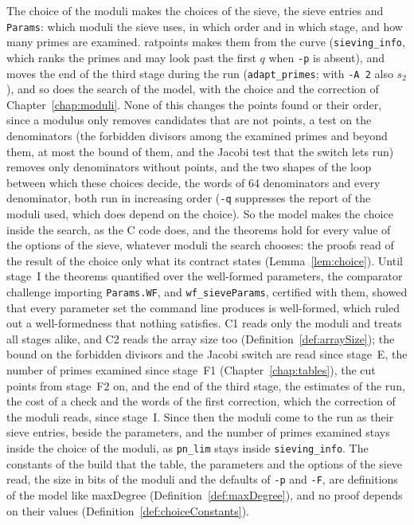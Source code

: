 The choice of the moduli makes the choices of the sieve, the sieve entries and \verb|Params|: which
moduli the sieve uses, in which order and in which stage, and how many primes are examined.
ratpoints makes them from the curve (\verb|sieving_info|, which ranks the primes and may look past
the first $q$ when \verb|-p| is absent), and moves the end of the third stage during the run
(\verb|adapt_primes|; with \verb|-A 2| also $s_2$), and so does the search of the model, with the
choice and the correction of Chapter~\ref{chap:moduli}. None of this changes the points found or
their order, since a modulus only removes candidates that are not points, a test on the denominators
(the forbidden divisors among the examined primes and beyond them, at most the bound of them, and
the Jacobi test that the switch lets run) removes only denominators without points, and the two
shapes of the loop between which these choices decide, the words of 64 denominators and every
denominator, both run in increasing order (\verb|-q| suppresses the report of the moduli used, which
does depend on the choice). So the model makes the choice inside the search, as the C code does, and
the theorems hold for every value of the options of the sieve, whatever moduli the search chooses:
the proofs read of the result of the choice only what its contract states (Lemma~\ref{lem:choice}).
Until stage~I the theorems quantified over the well-formed parameters, the comparator challenge
importing \verb|Params.WF|, and \verb|wf_sieveParams|, certified with them, showed that every
parameter set the command line produces is well-formed, which ruled out a well-formedness that
nothing satisfies. C1 reads only the moduli and treats all stages alike, and C2 reads the array size
too (Definition~\ref{def:arraySize}); the bound on the forbidden divisors and the Jacobi switch are
read since stage~E, the number of primes examined since stage~F1 (Chapter~\ref{chap:tables}), the
cut points from stage~F2 on, and the end of the third stage, the estimates of the run, the cost of a
check and the words of the first correction, which the correction of the moduli reads, since
stage~I. Since then the moduli come to the run as their sieve entries, beside the parameters, and
the number of primes examined stays inside the choice of the moduli, as \verb|pn_lim| stays inside
\verb|sieving_info|. The constants of the build that the table, the parameters and the options of
the sieve read, the size in bits of the moduli and the defaults of \verb|-p| and \verb|-F|, are
definitions of the model like $\mathrm{maxDegree}$ (Definition~\ref{def:maxDegree}), and no proof
depends on their values (Definition~\ref{def:choiceConstants}).

